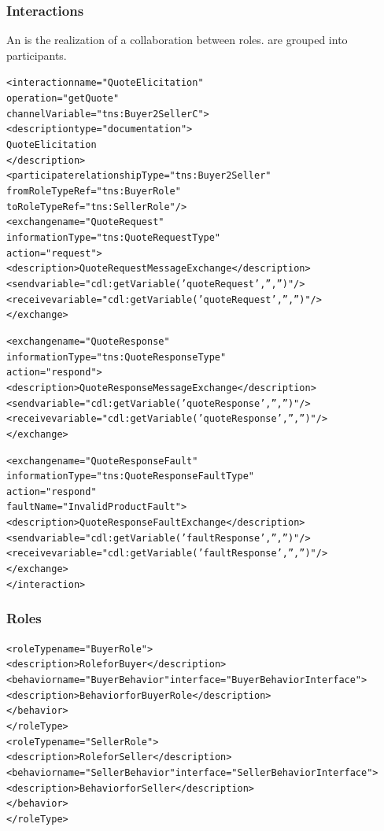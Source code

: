 \documentclass{note}
\begin{document}
\subsubsection{Interactions}
\bit
\w An  is the realization of a collaboration between roles.
 are grouped into participants.
\eit
\begin{alltt}
<interaction name="QuoteElicitation" 
             operation="getQuote" 
             channelVariable="tns:Buyer2SellerC">
    <description type="documentation">
        Quote Elicitation
    </description>
    <participate relationshipType="tns:Buyer2Seller" 
                 fromRoleTypeRef="tns:BuyerRole" 
                 toRoleTypeRef="tns:SellerRole"/>
    <exchange name="QuoteRequest" 
              informationType="tns:QuoteRequestType" 
              action="request">
        <description> Quote Request Message Exchange </description>
        <send variable="cdl:getVariable('quoteRequest','','')"/>
        <receive variable="cdl:getVariable('quoteRequest','','')"/>
    </exchange>

    <exchange name="QuoteResponse" 
              informationType="tns:QuoteResponseType" 
              action="respond">
        <description> Quote Response Message Exchange </description>
        <send variable="cdl:getVariable('quoteResponse','','')"/>
        <receive variable="cdl:getVariable('quoteResponse','','')"/>
    </exchange>

    <exchange name="QuoteResponseFault" 
              informationType="tns:QuoteResponseFaultType" 
              action="respond" 
              faultName="InvalidProductFault">
        <description> Quote Response Fault Exchange </description>
        <send variable="cdl:getVariable('faultResponse','','')"/>
        <receive variable="cdl:getVariable('faultResponse','','')"/>
    </exchange>
</interaction>
\end{alltt}

\subsubsection{Roles}
\begin{alltt}
<roleType name="BuyerRole">
    <description> Role for Buyer </description>
    <behavior name="BuyerBehavior" interface="BuyerBehaviorInterface">
        <description> Behavior for Buyer Role </description>
    </behavior>
</roleType>
<roleType name="SellerRole">
    <description> Role for Seller </description>
    <behavior name="SellerBehavior" interface="SellerBehaviorInterface">
        <description> Behavior for Seller </description>
    </behavior>
</roleType>
\end{alltt}
\end{document}
